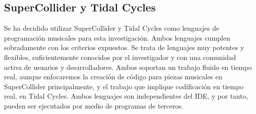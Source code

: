 \subsection{{SuperCollider} y {Tidal Cycles}}
Se ha decidido utilizar {SuperCollider} y {Tidal Cycles} como lenguajes de programación musicales para esta investigación. Ambos lenguajes cumplen sobradamente con los criterios expuestos. Se trata de lenguajes muy potentes y flexibles, suficientemente conocidos por el investigador y con una comunidad activa de usuarios y desarrolladores. Ambos soportan un trabajo fluido en tiempo real, aunque enfocaremos la creación de código para piezas musicales en {SuperCollider} principalmente, y el trabajo que implique codificación en tiempo real, en {Tidal Cycles}. Ambos lenguajes son independientes del IDE, y por tanto, pueden ser ejecutados por medio de programas de terceros. 







